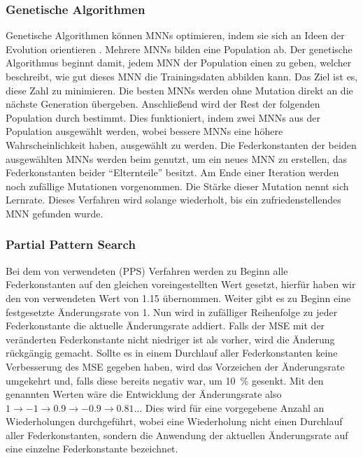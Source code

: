 \subsubsection{Genetische Algorithmen}

Genetische Algorithmen können MNNs optimieren, indem sie sich an Ideen der Evolution orientieren \cite{gentisch}. Mehrere MNNs bilden eine Population ab.
Der genetische Algorithmus beginnt damit, jedem MNN der Population einen  zu geben, welcher beschreibt, wie gut dieses MNN die Trainingsdaten abbilden kann. Das Ziel ist es, diese Zahl zu minimieren.
Die besten MNNs werden ohne Mutation direkt an die nächste Generation übergeben.
Anschließend wird der Rest der folgenden Population durch  bestimmt. Dies funktioniert, indem zwei MNNs aus der Population ausgewählt werden, wobei bessere MNNs eine höhere Wahrscheinlichkeit haben, ausgewählt zu werden.
Die Federkonstanten der beiden ausgewählten MNNs werden beim  genutzt, um ein neues MNN zu erstellen, das Federkonstanten beider \enquote{Elternteile} besitzt.
Am Ende einer Iteration werden noch zufällige Mutationen vorgenommen. Die Stärke dieser Mutation nennt sich Lernrate.
Dieses Verfahren wird solange wiederholt, bis ein zufriedenstellendes MNN gefunden wurde.

\subsubsection{Partial Pattern Search}

Bei dem von \lee{} verwendeten  (PPS) Verfahren werden zu Beginn alle Federkonstanten auf den gleichen voreingestellten Wert gesetzt, hierfür  haben wir den von \lee{} verwendeten Wert von \num{1,15} %
übernommen.
Weiter gibt es zu Beginn eine festgesetzte Änderungsrate von 1.
Nun wird in zufälliger Reihenfolge zu jeder Federkonstante die aktuelle Änderungsrate addiert. Falls der MSE mit der veränderten Federkonstante nicht niedriger ist als vorher, wird die Änderung rückgängig gemacht.
Sollte es in einem Durchlauf aller Federkonstanten keine Verbesserung des MSE gegeben haben, wird das Vorzeichen der Änderungsrate umgekehrt und, falls diese bereits negativ war, um \SI{10}{\percent} gesenkt. Mit den genannten Werten wäre die Entwicklung der Änderungsrate also $1 \rightarrow -1 \rightarrow 0.9 \rightarrow -0.9 \rightarrow 0.81 \dots$
Dies wird für eine vorgegebene Anzahl an Wiederholungen durchgeführt, wobei eine Wiederholung nicht einen Durchlauf aller Federkonstanten, sondern die Anwendung der aktuellen Änderungsrate auf eine einzelne Federkonstante bezeichnet.